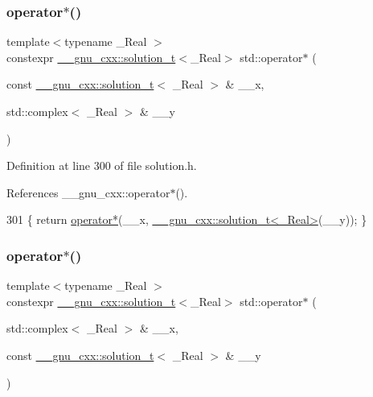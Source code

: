 \subsubsection{\texorpdfstring{operator$\ast$()}{operator*()}\hspace{0.1cm}{\footnotesize\ttfamily [4/5]}}
{\footnotesize\ttfamily template$<$typename \+\_\+\+Real $>$ \\
constexpr \hyperlink{namespace____gnu__cxx_ae20ea642de50eb361074c62676b0159c}{\+\_\+\+\_\+gnu\+\_\+cxx\+::solution\+\_\+t}$<$\+\_\+\+Real$>$ std\+::operator$\ast$ (\begin{DoxyParamCaption}\item[{const \hyperlink{namespace____gnu__cxx_ae20ea642de50eb361074c62676b0159c}{\+\_\+\+\_\+gnu\+\_\+cxx\+::solution\+\_\+t}$<$ \+\_\+\+Real $>$ \&}]{\+\_\+\+\_\+x,  }\item[{std\+::complex$<$ \+\_\+\+Real $>$ \&}]{\+\_\+\+\_\+y }\end{DoxyParamCaption})}



Definition at line 300 of file solution.\+h.



References \+\_\+\+\_\+gnu\+\_\+cxx\+::operator$\ast$().


\begin{DoxyCode}
301     \{ \textcolor{keywordflow}{return} \hyperlink{namespacestd_ae82d1f9ca11a46b93a33f2f89ce71305}{operator*}(\_\_x, \hyperlink{namespace____gnu__cxx_ae20ea642de50eb361074c62676b0159c}{\_\_gnu\_cxx::solution\_t<\_Real>}(\_\_y)); \}
\end{DoxyCode}
\mbox{\label{namespacestd_ae82d1f9ca11a46b93a33f2f89ce71305}} 
\subsubsection{\texorpdfstring{operator$\ast$()}{operator*()}\hspace{0.1cm}{\footnotesize\ttfamily [5/5]}}
{\footnotesize\ttfamily template$<$typename \+\_\+\+Real $>$ \\
constexpr \hyperlink{namespace____gnu__cxx_ae20ea642de50eb361074c62676b0159c}{\+\_\+\+\_\+gnu\+\_\+cxx\+::solution\+\_\+t}$<$\+\_\+\+Real$>$ std\+::operator$\ast$ (\begin{DoxyParamCaption}\item[{std\+::complex$<$ \+\_\+\+Real $>$ \&}]{\+\_\+\+\_\+x,  }\item[{const \hyperlink{namespace____gnu__cxx_ae20ea642de50eb361074c62676b0159c}{\+\_\+\+\_\+gnu\+\_\+cxx\+::solution\+\_\+t}$<$ \+\_\+\+Real $>$ \&}]{\+\_\+\+\_\+y }\end{DoxyParamCaption})}



